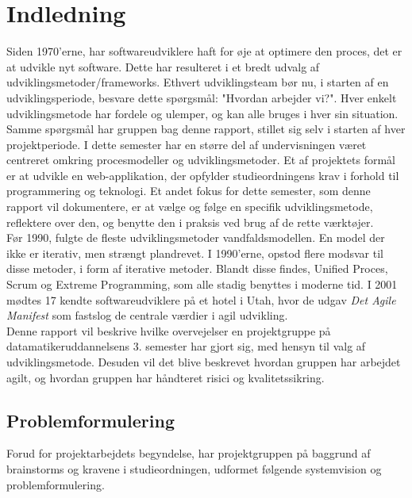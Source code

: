\chapter{Indledning}\label{ch:indledning}
Siden 1970'erne, har softwareudviklere haft for øje at optimere den proces, det er at udvikle nyt software.
Dette har resulteret i et bredt udvalg af udviklingsmetoder/frameworks. Ethvert udviklingsteam bør nu, 
i starten af en udviklingsperiode, besvare dette spørgsmål: "Hvordan arbejder vi?". 
Hver enkelt udviklingsmetode har fordele og ulemper, og kan alle bruges i hver sin situation. \\

Samme spørgsmål har gruppen bag denne rapport, stillet sig selv i starten af hver projektperiode. 
I dette semester har en større del af undervisningen
været centreret omkring procesmodeller og udviklingsmetoder. 
Et af projektets formål er at udvikle en web-applikation, der opfylder studieordningens krav
i forhold til programmering og teknologi. Et andet fokus for dette semester, 
som denne rapport vil dokumentere, er at vælge og følge en specifik udviklingsmetode, 
reflektere over den, og benytte den i praksis ved brug af de rette værktøjer. \\

Før 1990, fulgte de fleste udviklingsmetoder vandfaldsmodellen. En model der ikke er iterativ, 
men strængt plandrevet. I 1990'erne, opstod flere modsvar til
disse metoder, i form af iterative metoder. Blandt disse findes, Unified Proces, Scrum og Extreme Programming, 
som alle stadig benyttes i moderne tid.
I 2001 mødtes 17 kendte softwareudviklere på et hotel i Utah, 
hvor de udgav \textit{Det Agile Manifest} som fastslog de centrale værdier i agil udvikling. \\

Denne rapport vil beskrive hvilke overvejelser en projektgruppe på 
datamatikeruddannelsens 3. semester har gjort sig, med hensyn til valg af udviklingsmetode.
Desuden vil det blive beskrevet hvordan gruppen har arbejdet agilt, 
og hvordan gruppen har håndteret risici og kvalitetssikring.

\newpage
\section{Problemformulering}
Forud for projektarbejdets begyndelse, har projektgruppen på baggrund af brainstorms og kravene i
studieordningen, udformet følgende systemvision og problemformulering. \\

